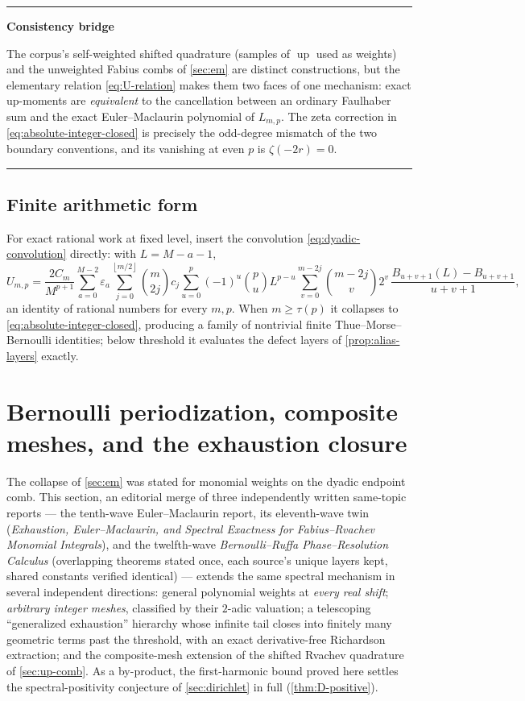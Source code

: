 \documentclass[11pt,oneside]{article}
\numberwithin{equation}{section}
\theoremstyle{definition}
\theoremstyle{remark}
\newcommand{\Up}{\operatorname{up}}
\newcommand{\eps}{\varepsilon}
\newcommand{\floor}[1]{\left\lfloor #1\right\rfloor}
\newenvironment{statusbox}[1]{%
  \par\smallskip\noindent\begin{center}\begin{minipage}{0.94\textwidth}%
  \hrule\vspace{0.5em}\noindent\textbf{#1}\par\smallskip
}{%
  \vspace{0.5em}\hrule\end{minipage}\end{center}\smallskip
}
\begin{document}
\begin{statusbox}{Consistency bridge}
The corpus's self-weighted shifted quadrature (samples of $\Up$ used as
weights) and the unweighted Fabius combs of \cref{sec:em} are distinct
constructions, but the elementary relation
\eqref{eq:U-relation} makes them two faces of one mechanism: exact
up-moments are \emph{equivalent} to the cancellation between an
ordinary Faulhaber sum and the exact Euler--Maclaurin polynomial of
$L_{m,p}$.  The zeta correction in
\eqref{eq:absolute-integer-closed} is precisely the odd-degree
mismatch of the two boundary conventions, and its vanishing at even
$p$ is $\zeta(-2r)=0$.
\end{statusbox}

\subsection{Finite arithmetic form}

For exact rational work at fixed level, insert the convolution
\eqref{eq:dyadic-convolution} directly: with $L=M-a-1$,
\begin{equation}
 U_{m,p}=\frac{2C_m}{M^{p+1}}
 \sum_{a=0}^{M-2}\eps_a
 \sum_{j=0}^{\floor{m/2}}\binom m{2j}c_j
 \sum_{u=0}^{p}(-1)^{u}\binom pu L^{p-u}
 \sum_{v=0}^{m-2j}\binom{m-2j}{v}2^{v}\,
 \frac{B_{u+v+1}(L)-B_{u+v+1}}{u+v+1},
 \label{eq:absolute-Bernoulli}
\end{equation}
an identity of rational numbers for every $m,p$.  When
$m\ge\tau(p)$ it collapses to \eqref{eq:absolute-integer-closed},
producing a family of nontrivial finite Thue--Morse--Bernoulli
identities; below threshold it evaluates the defect layers of
\cref{prop:alias-layers} exactly.

\section{Bernoulli periodization, composite meshes, and the exhaustion
closure}
\label{sec:periodized}

The collapse of \cref{sec:em} was stated for monomial weights on the
dyadic endpoint comb.  This section, an editorial merge of three
independently written same-topic reports --- the tenth-wave
Euler--Maclaurin report, its eleventh-wave twin (\emph{Exhaustion,
Euler--Maclaurin, and Spectral Exactness for Fabius--Rvachev Monomial
Integrals}), and the twelfth-wave \emph{Bernoulli--Ruffa
Phase--Resolution Calculus} (overlapping theorems stated once, each
source's unique layers kept, shared constants verified identical) ---
extends the same spectral mechanism in several independent
directions: general polynomial weights at \emph{every real
shift}; \emph{arbitrary integer meshes}, classified by their $2$-adic
valuation; a telescoping ``generalized exhaustion'' hierarchy whose
infinite tail closes into finitely many geometric terms past the
threshold, with an exact derivative-free Richardson extraction; and the
composite-mesh extension of the shifted Rvachev quadrature of
\cref{sec:up-comb}.  As a by-product, the first-harmonic bound proved
here settles the spectral-positivity conjecture of
\cref{sec:dirichlet} in full (\cref{thm:D-positive}).
\end{document}
